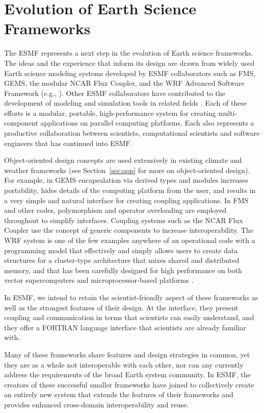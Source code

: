 \section{Evolution of Earth Science Frameworks}
\label{sec:archbackground}

The ESMF represents a next step in the evolution of Earth science
frameworks.  The ideas and the experience that inform its design
are drawn from widely used Earth science modeling systems 
developed by ESMF collaborators such as FMS, GEMS, the modular NCAR 
Flux Coupler, and the WRF Advanced Software Framework (e.g., \cite{fms, gems,
wrf, ncarcpl}).  Other ESMF collaborators 
have contributed to the development of modeling and simulation tools in related 
fields \cite{deluca, petsc}.  Each of these efforts is a modular,
portable, high-performance system for creating multi-component applications
on parallel computing platforms.  Each also represents a productive
collaboration between scientists, computational scientists and software
engineers that has continued into ESMF.  

Object-oriented design concepts are used extensively in existing climate and
weather frameworks (see Section~\ref{sec:oop} for more on object-oriented design). 
For example, in GEMS encapsulation 
via derived types and modules increases portability, hides details of the 
computing platform from the user, and results in a very simple and natural
interface for creating coupling applications.  
In FMS and other codes, polymorphism and operator overloading are 
employed throughout to simplify interfaces.  Coupling systems such 
as the NCAR Flux Coupler use the concept of generic components to
increase interoperability.  The WRF system is one of the few 
examples anywhere of an operational code with a programming model 
that effectively and simply allows users to create data structures 
for a cluster-type architecture that mixes shared and distributed memory, 
and that has been carefully designed for high performance on both vector 
supercomputers and microprocessor-based platforms \cite{wrfperfport}.

In ESMF, we intend to retain the scientist-friendly 
aspect of these frameworks as well as the strongest features of their design.  
At the interface, they present coupling and
communication in terms that scientists can easily understand, and they 
offer a FORTRAN language interface that scientists are already familiar 
with.  

Many of these frameworks share features and design strategies in common, yet 
they are as a whole not
interoperable with each other, nor can any currently address the requirements
of the broad Earth system community.  In ESMF, the creators of 
these successful smaller frameworks have joined to collectively create an
entirely new system that extends the features of their frameworks and provides 
enhanced cross-domain interoperability and reuse.



